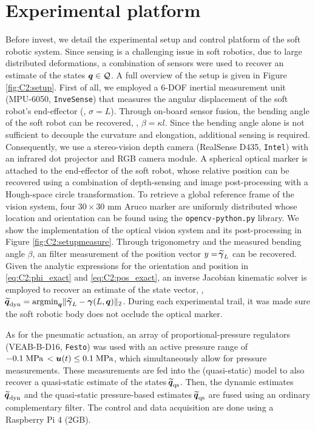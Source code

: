 \section{Experimental platform}
\noindent Before invest, we detail the experimental setup and control platform of the soft robotic system. Since sensing is a challenging issue in soft robotics, due to large distributed deformations, a combination of sensors were used to recover an estimate of the states ${\boldsymbol{q}} \in \mathcal{Q}$. A full overview of the setup is given in Figure \ref{fig:C2:setup}. First of all, we employed a 6-DOF inertial measurement unit (MPU-6050, \texttt{InveSense}) that measures the angular displacement of the soft robot's end-effector (\ie, $\sigma = L$). Through on-board sensor fusion, the bending angle of the soft robot can be recovered, \ie, $\beta = \kappa l$. Since the bending angle alone is not sufficient to decouple the curvature and elongation, additional sensing is required. Consequently, we use a stereo-vision depth camera (RealSense D435, \texttt{Intel}) with an infrared dot projector and RGB camera module. A spherical optical marker is attached to the end-effector of the soft robot, whose relative position can be recovered using a combination of depth-sensing and image post-processing with a Hough-space circle transformation. To retrieve a global reference frame of the vision system, four $30\!\times \!30$ \si{\milli \metre} Aruco marker are uniformly distributed whose location and orientation can be found using the \texttt{opencv-python.py} library. We show the implementation of the optical vision system and its post-processing in Figure \ref{fig:C2:setupmeasure}. Through trigonometry and the measured bending angle $\beta$, an filter measurement of the position vector $y = \widetilde{\!\boldsymbol{\gamma}}_L$ can be recovered. Given the analytic expressions for the orientation and position in \eqref{eq:C2:phi_exact} and \eqref{eq:C2:pos_exact}, an inverse Jacobian kinematic solver is employed to recover an estimate of the state vector, \ie, $\widetilde{\!\boldsymbol{q}}_{\textrm{dyn}} = \textrm{argmin}_{{\boldsymbol{q}}} \lVert \, \widetilde{\!\boldsymbol{\gamma}}_L - {\boldsymbol{\gamma}}(L,{\boldsymbol{q}}) \rVert_2$. During each experimental trail, it was made sure the soft robotic body does not occlude the optical marker.

As for the pneumatic actuation, an array of proportional-pressure regulators (VEAB-B-D16, \texttt{Festo}) was used with an active pressure range of $-0.1 \;\text{MPa}\, < {\boldsymbol{u}}(t) \le 0.1 \; \textrm{MPa}$, which simultaneously allow for pressure measurements. These measurements are fed into the (quasi-static) model to also recover a quasi-static estimate of the states $\widetilde{\!\boldsymbol{q}}_{\textrm{qs}}$. Then, the dynamic estimates $\widetilde{\!\boldsymbol{q}}_{\textrm{dyn}}$ and the quasi-static pressure-based estimates $\widetilde{\!\boldsymbol{q}}_{\textrm{qs}}$ are fused using an ordinary complementary filter. The control and data acquisition are done using a {Raspberry Pi 4} (2GB). 


